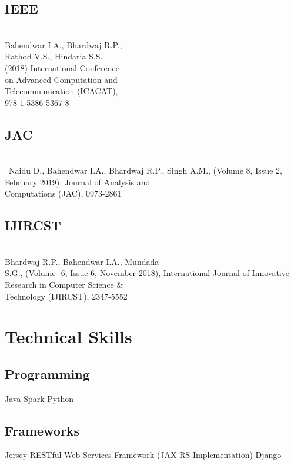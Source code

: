 \documentclass[]{deedy-resume-openfont}
\begin{document}
\begin{minipage}[t]{0.33\textwidth}
\subsection{IEEE}
\href{http://shorturl.at/rzMNZ}{} \\
Bahendwar I.A., Bhardwaj R.P., \\Rathod V.S., Hindaria S.S. \\(2018) International Conference \\on Advanced Computation and \\Telecommunication (ICACAT),\\ 978-1-5386-5367-8
\sectionsep

\subsection{JAC}
\href{http://shorturl.at/bkADF}{} \\\
Naidu D., Bahendwar I.A., Bhardwaj R.P., Singh A.M., (Volume 8, Issue 2, February 2019), Journal of Analysis and \\Computations (JAC), 0973-2861
\sectionsep

\subsection{IJIRCST}
\href{http://shorturl.at/dnAG0}{} \\
Bhardwaj R.P., Bahendwar I.A., Mundada \\S.G., (Volume- 6, Issue-6, November-2018), International Journal of Innovative \\Research in Computer Science \& \\Technology (IJIRCST), 2347-5552
\sectionsep



\section{Technical Skills}
\subsection{Programming}
Java \textbullet{} Spark \textbullet{} Python\\
\sectionsep
\subsection{Frameworks}
Jersey RESTful Web Services Framework (JAX-RS Implementation)\textbullet{} Django
\sectionsep

\end{minipage}
\end{document}
